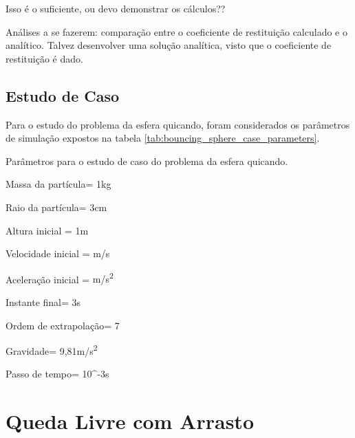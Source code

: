 \alert{Isso é o suficiente, ou devo demonstrar os cálculos??}


\alert{Análises a se fazerem: comparação entre o coeficiente de restituição calculado e o analítico. Talvez desenvolver uma solução analítica, visto que o coeficiente de restituição é dado.}

\subsection{\alert{Estudo de Caso}}

Para o estudo do problema da esfera quicando, foram considerados os parâmetros de simulação expostos na tabela \ref{tab:bouncing_sphere_case_parameters}.

\begin{table}[h]
\centering
\caption{Parâmetros para o \alert{estudo de caso} do problema da esfera quicando.}
\label{tab:bouncing_sphere_case_parameters}
\begin{parametersdesc}
	\item{Massa da partícula}{\mass = 1}{\si\kilogram}
	\item{Raio da partícula}{\radius = 3}{\si\centi\metre}
	\item{Altura inicial}{\initial{\positiony} = 1}{\si{\metre}}
	\item{Velocidade inicial}{\explicitVector{\initial{\velocityx}}{\initial{\velocityy}}{\initial{\velocityz}} = }{\si[per-mode=symbol]{\metre\per\second}}
	\item{Aceleração inicial}{\explicitVector{\initial{\accelerationx}}{\initial{\accelerationy}}{\initial{\accelerationz}} = }{\si[per-mode=symbol]{\metre\per\square\second}}
	\item{Instante final}{\finalInstant = 3}{\si\second} 
	\item{Ordem de extrapolação}{\taylorOrder = 7}{\emptyTableEntry}
	\item{Gravidade}{\gravityScalar = 9,81}{\si[per-mode=symbol]{\metre\per\square\second}}
	\item{Passo de tempo}{\Dt = 10^{-3}}{\si\second}
\end{parametersdesc}
\sourceMe 
\end{table}

\section{Queda Livre com Arrasto}

